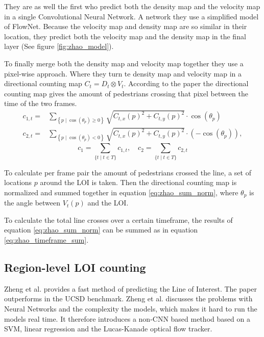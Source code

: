 

They are as well the first who predict both the density map and the velocity map in a single Convolutional Neural Network. A network they use a  simplified model of FlowNet. Because the velocity map and density map are so similar in their location, they predict both the velocity map and the density map in the final layer (See figure \ref{fig:zhao_model}).

To finally merge both the density map and velocity map together they use a pixel-wise approach. Where they turn te density map and velocity map in a directional counting map $C_t=D_t \otimes V_t$. According to the paper the directional counting map gives the amount of pedestrians crossing that pixel between the time of the two frames.
\begin{equation}
\begin{aligned}
c_{1, t} =& \sum_{\left\{p \mid \cos \left(\theta_{p}\right) \geq 0\right\}} \sqrt{C_{t, x}(p)^{2}+C_{t, y}(p)^{2}} \cdot \cos \left(\theta_{p}\right) \\
c_{2, t} =& \sum_{\left\{p \mid \cos \left(\theta_{p}\right)<0\right\}} \sqrt{C_{t, x}(p)^{2}+C_{t, y}(p)^{2}} \cdot\left(-\cos \left(\theta_{p}\right)\right),
\end{aligned}
\label{eq:zhao_sum_norm}
\end{equation}
\begin{equation}
c_{1}=\sum_{\{t \mid t \in T\}} c_{1, t}, \quad c_{2}=\sum_{\{t \mid t \in T\}} c_{2, t}
\label{eq:zhao_timeframe_sum}
\end{equation}

To calculate per frame pair the amount of pedestrians crossed the line, a set of locations $p$ around the LOI is taken. Then the directional counting map is normalized and summed together in equation \ref{eq:zhao_sum_norm}, where $\theta_p$ is the angle between $V_t(p)$ and the LOI.

To calculate the total line crosses over a certain timeframe, the results of equation \ref{eq:zhao_sum_norm} can be summed as in equation \ref{eq:zhao_timeframe_sum}.


\subsection{Region-level LOI counting}
Zheng et al. \cite{zheng_cross-line_2019} provides a fast method of predicting the Line of Interest. The paper outperforms \cite{leibe_crossing-line_2016} in the UCSD benchmark. Zheng et al. discusses the problems with Neural Networks and the complexity the models, which makes it hard to run the models real time. It therefore introduces a non-CNN based method based on a SVM, linear regression and the Lucas-Kanade optical flow tracker.

